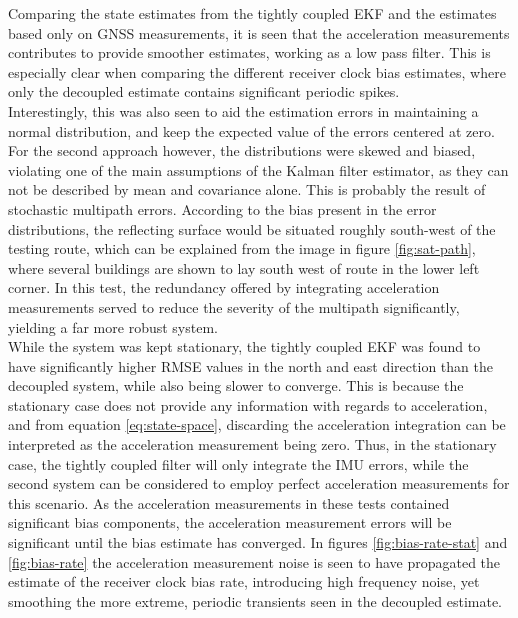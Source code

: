     Comparing the state estimates from the tightly coupled EKF and the estimates based only on GNSS measurements, it is seen that the acceleration measurements contributes to provide smoother estimates, working as a low pass filter. This is especially clear when comparing the different receiver clock bias estimates, where only the decoupled estimate contains significant periodic spikes. \\
    
    Interestingly, this was also seen to aid the estimation errors in maintaining a normal distribution, and keep the expected value of the errors centered at zero. For the second approach however, the distributions were skewed and biased, violating one of the main assumptions of the Kalman filter estimator, as they can not be described by mean and covariance alone. This is probably the result of stochastic multipath errors. According to the bias present in the error distributions, the reflecting surface would be situated roughly south-west of the testing route, which can be explained from the image in figure \ref{fig:sat-path}, where several buildings are shown to lay south west of route in the lower left corner. In this test, the redundancy offered by integrating acceleration measurements served to reduce the severity of the multipath significantly, yielding a far more robust system. \\
    
    While the system was kept stationary, the tightly coupled EKF was found to have significantly higher RMSE values in the north and east direction than the decoupled system, while also being slower to converge. This is because the stationary case does not provide any information with regards to acceleration, and from equation \ref{eq:state-space}, discarding the acceleration integration can be interpreted as the acceleration measurement being zero. Thus, in the stationary case, the tightly coupled filter will only integrate the IMU errors, while the second system can be considered to employ perfect acceleration measurements for this scenario. As the acceleration measurements in these tests contained significant bias components, the acceleration measurement errors will be significant until the bias estimate has converged. In figures \ref{fig:bias-rate-stat} and \ref{fig:bias-rate} the acceleration measurement noise is seen to have propagated the estimate of the receiver clock bias rate, introducing high frequency noise, yet smoothing the more extreme, periodic transients seen in the decoupled estimate.\\
    
